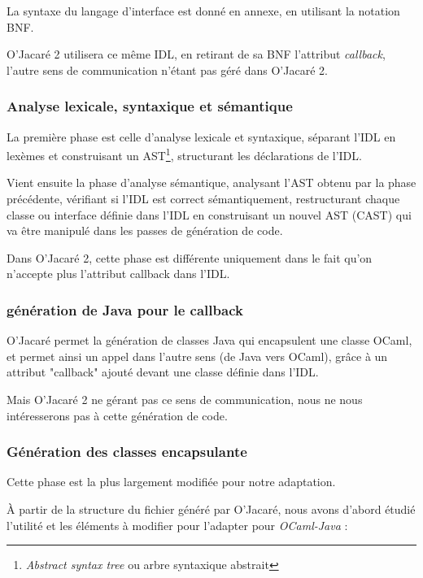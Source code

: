 \documentclass[a4paper, 11pt]{article}
\begin{document}
La syntaxe du langage d'interface est donné en annexe, en utilisant la
notation BNF.

O'Jacaré 2 utilisera ce même IDL, en retirant de sa BNF l'attribut \emph{callback}, l'autre sens de communication n'étant pas géré dans O'Jacaré 2.

\subsubsection{Analyse lexicale, syntaxique et sémantique }
La première phase est celle d'analyse lexicale et syntaxique,
séparant l'IDL en lexèmes et construisant un AST\footnote{\emph{Abstract syntax tree} ou arbre syntaxique abstrait}, structurant les déclarations de l'IDL.

Vient ensuite la phase d'analyse sémantique, analysant l'AST obtenu par la
phase précédente, vérifiant si l'IDL est correct sémantiquement,
restructurant chaque classe ou interface définie dans l'IDL en construisant un nouvel AST (CAST) qui va être manipulé dans les passes de génération de code.

Dans O'Jacaré 2, cette phase est différente uniquement dans le fait qu'on n'accepte plus l'attribut callback dans l'IDL. 

\subsubsection{génération de Java pour le callback}
O'Jacaré permet la génération de classes Java qui encapsulent une classe OCaml, et permet ainsi un appel dans l'autre sens (de Java vers OCaml), grâce à un attribut "callback" ajouté devant une classe définie dans l'IDL.

Mais O'Jacaré 2 ne gérant pas ce sens de communication, nous ne nous intéresserons pas à cette génération de code.

\subsubsection{Génération des classes encapsulante}

Cette phase est la plus largement modifiée pour notre adaptation.

\`A partir de la structure du fichier généré par O'Jacaré, nous avons d'abord étudié l'utilité et les éléments à modifier pour l'adapter pour \emph{OCaml-Java} :
\end{document}
